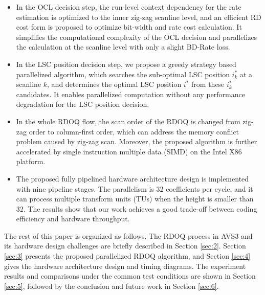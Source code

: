 \documentclass[lettersize,journal]{IEEEtran}
\begin{document}
\begin{itemize}[]
	\item In the OCL decision step, the run-level context dependency for the rate estimation is optimized to the inner zig-zag scanline level, and an efficient RD cost form is proposed to optimize bit-width and rate cost calculation. It simplifies the computational complexity of the OCL decision and parallelizes the calculation at the scanline level with only a slight BD-Rate loss. 
	 \item In the LSC position decision step, we propose a greedy strategy based parallelized algorithm, which searches the sub-optimal LSC position $i_{k}^{*}$ at a scanline $k$, and determines the optimal LSC position $i^{*}$ from these $i_{k}^{*}$ candidates. It enables parallelized computation without any performance degradation for the LSC position decision. 
	 \item In the whole RDOQ flow, the scan order of the RDOQ is changed from zig-zag order to column-first order, which can address the memory conflict problem caused by zig-zag scan. Moreover, the proposed algorithm is further accelerated by single instruction multiple data (SIMD) on the Intel X86 platform. 
	\item The proposed fully pipelined hardware architecture design is implemented with nine pipeline stages. The parallelism is 32 coefficients per cycle, and it can process multiple transform units (TUs) when the height is smaller than 32. The results show that our work achieves a good trade-off between coding efficiency and hardware throughput. 
\end{itemize}
\par
The rest of this paper is organized as follows. The RDOQ process in AVS3 and its hardware design challenges are briefly described in Section \ref{sec:2}. Section \ref{sec:3} presents the proposed parallelized RDOQ algorithm, and Section \ref{sec:4} gives the hardware architecture design and timing diagrams. The experiment results and comparisons under the common test conditions are shown in Section \ref{sec:5}, followed by the conclusion and future work in Section \ref{sec:6}. 
\end{document}
